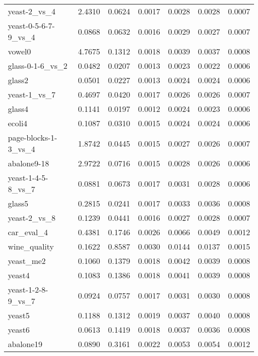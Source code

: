 \begin{table}[htbp]
{\begin{tabular}{lcccccc}
			yeast-2\_vs\_4 & 2.4310 & 0.0624 & 0.0017 & 0.0028 & 0.0028 & 0.0007 \\
			yeast-0-5-6-7-9\_vs\_4 & 0.0868 & 0.0632 & 0.0016 & 0.0029 & 0.0027 & 0.0007 \\
			vowel0 & 4.7675 & 0.1312 & 0.0018 & 0.0039 & 0.0037 & 0.0008 \\
			glass-0-1-6\_vs\_2 & 0.0482 & 0.0207 & 0.0013 & 0.0023 & 0.0022 & 0.0006 \\
			glass2 & 0.0501 & 0.0227 & 0.0013 & 0.0024 & 0.0024 & 0.0006 \\
			yeast-1\_vs\_7 & 0.4697 & 0.0420 & 0.0017 & 0.0026 & 0.0026 & 0.0007 \\
			glass4 & 0.1141 & 0.0197 & 0.0012 & 0.0024 & 0.0023 & 0.0006 \\
			ecoli4 & 0.1087 & 0.0310 & 0.0015 & 0.0024 & 0.0024 & 0.0006 \\
			page-blocks-1-3\_vs\_4 & 1.8742 & 0.0445 & 0.0015 & 0.0027 & 0.0026 & 0.0007 \\
			abalone9-18 & 2.9722 & 0.0716 & 0.0015 & 0.0028 & 0.0026 & 0.0006 \\
			yeast-1-4-5-8\_vs\_7 & 0.0881 & 0.0673 & 0.0017 & 0.0031 & 0.0028 & 0.0006 \\
			glass5 & 0.2815 & 0.0241 & 0.0017 & 0.0033 & 0.0036 & 0.0008 \\
			yeast-2\_vs\_8 & 0.1239 & 0.0441 & 0.0016 & 0.0027 & 0.0028 & 0.0007 \\
			car\_eval\_4 & 0.4381 & 0.1746 & 0.0026 & 0.0066 & 0.0049 & 0.0012 \\
			wine\_quality & 0.1622 & 0.8587 & 0.0030 & 0.0144 & 0.0137 & 0.0015 \\
			yeast\_me2 & 0.1060 & 0.1379 & 0.0018 & 0.0042 & 0.0039 & 0.0008 \\
			yeast4 & 0.1083 & 0.1386 & 0.0018 & 0.0041 & 0.0039 & 0.0008 \\
			yeast-1-2-8-9\_vs\_7 & 0.0924 & 0.0757 & 0.0017 & 0.0031 & 0.0030 & 0.0008 \\
			yeast5 & 0.1188 & 0.1312 & 0.0019 & 0.0037 & 0.0040 & 0.0008 \\
			yeast6 & 0.0613 & 0.1419 & 0.0018 & 0.0037 & 0.0036 & 0.0008 \\
			abalone19 & 0.0890 & 0.3161 & 0.0022 & 0.0053 & 0.0054 & 0.0012 \\
			\bottomrule
		\end{tabular}%
		
	}
	\label{tab:ProcessingTime}%
\end{table}%

